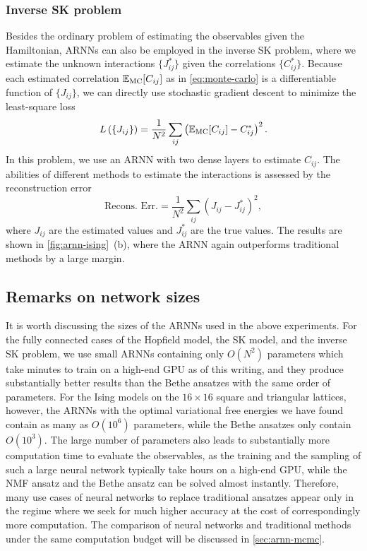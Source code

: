 \subsubsection{Inverse SK problem}

Besides the ordinary problem of estimating the observables given the Hamiltonian, ARNNs can also be employed in the inverse SK problem, where we estimate the unknown interactions $\{J^*_{i j}\}$ given the correlations $\{C^*_{i j}\}$. Because each estimated correlation $\mathbb{E}_\text{MC}[C_{i j}]$ as in \cref{eq:monte-carlo} is a differentiable function of $\{J_{i j}\}$, we can directly use stochastic gradient descent to minimize the least-square loss
\begin{equation}
L\left( \{J_{i j}\} \right) = \frac{1}{N^2} \sum_{i j} \left( \mathbb{E}_\text{MC}[C_{i j}] - C^*_{i j} \right)^2.
\end{equation}
In this problem, we use an ARNN with two dense layers to estimate $C_{i j}$. The abilities of different methods to estimate the interactions is assessed by the reconstruction error
\begin{equation}
\text{Recons. Err.} = \frac{1}{N^2} \sum_{i j} \left( J_{i j} - J^*_{i j} \right)^2,
\end{equation}
where $J_{i j}$ are the estimated values and $J^*_{i j}$ are the true values. The results are shown in \cref{fig:arnn-ising}~(b), where the ARNN again outperforms traditional methods by a large margin.

\subsection{Remarks on network sizes}

It is worth discussing the sizes of the ARNNs used in the above experiments. For the fully connected cases of the Hopfield model, the SK model, and the inverse SK problem, we use small ARNNs containing only $O(N^2)$ parameters which take minutes to train on a high-end GPU as of this writing, and they produce substantially better results than the Bethe ansatzes with the same order of parameters. For the Ising models on the $16 \times 16$ square and triangular lattices, however, the ARNNs with the optimal variational free energies we have found contain as many as $O(10^6)$ parameters, while the Bethe ansatzes only contain $O(10^3)$. The large number of parameters also leads to substantially more computation time to evaluate the observables, as the training and the sampling of such a large neural network typically take hours on a high-end GPU, while the NMF ansatz and the Bethe ansatz can be solved almost instantly. Therefore, many use cases of neural networks to replace traditional ansatzes appear only in the regime where we seek for much higher accuracy at the cost of correspondingly more computation. The comparison of neural networks and traditional methods under the same computation budget will be discussed in \cref{sec:arnn-mcmc}.

